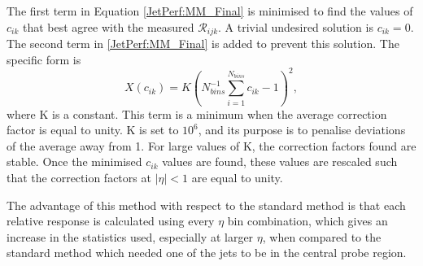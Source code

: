 The first term in Equation \ref{JetPerf:MM_Final} is minimised to find the values of $c_{ik}$ that best agree with the measured $\mathcal{R}_{ijk}$. 
A trivial undesired solution is $c_{ik}=0$. 
The second term in \ref{JetPerf:MM_Final} is added to prevent this solution.
The specific form is 
\begin{equation}
X(c_{ik})= K(N^{-1}_{bins} \sum\limits^{N_{bins}}_{i=1} c_{ik} - 1 )^2,
\end{equation}
where K is a constant.
This term is a minimum when the average correction factor is equal to unity.
K is set to $10^6$, and its purpose is to penalise deviations of the average away from 1. 
For large values of K, the correction factors found are stable.
Once the minimised $c_{ik}$ values are found, these values are rescaled such that the correction factors at $|\eta|<1$ are equal to unity. 

The advantage of this method with respect to the standard method is that each relative response is calculated using every $\eta$ bin combination, which gives an increase in the statistics used, especially at larger $\eta$, when compared to the standard method which needed one of the jets to be in the central probe region.
